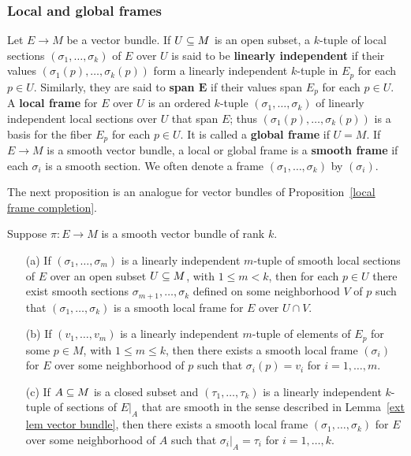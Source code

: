 \subsubsection{Local and global frames}
Let $E\to M$ be a vector bundle. If $U\subseteq M$ is an open subset, a $k$-tuple of local sections $(\sigma_1,\dots,\sigma_k)$ of $E$ over $U$ is said to be \textbf{linearly independent} if their values $(\sigma_1(p),\dots,\sigma_k(p))$ form a linearly independent $k$-tuple in $E_p$ for each $p\in U$. Similarly, they are said to \textbf{span $\bm{E}$} if their values span $E_p$ for each $p\in U$. A \textbf{local frame} for $E$ over $U$ is an ordered $k$-tuple $(\sigma_1,\dots,\sigma_k)$ of linearly independent local sections over $U$ that span $E$; thus $(\sigma_1(p),\dots,\sigma_k(p))$ is a basis for the fiber $E_p$ for each $p\in U$. It is called a \textbf{global frame} if $U=M$. If $E\to M$ is a smooth vector bundle, a local or global frame is a \textbf{smooth frame} if each $\sigma_i$ is a smooth section. We often denote a frame $(\sigma_1,\dots,\sigma_k)$ by $(\sigma_i)$.\par
The next proposition is an analogue for vector bundles of Proposition~\ref{local frame completion}.
\begin{proposition}\label{vector bundle local frame completion}
Suppose $\pi:E\to M$ is a smooth vector bundle of rank $k$.
\begin{itemize}
\item[(a)] If $(\sigma_1,\dots,\sigma_m)$ is a linearly independent $m$-tuple of smooth local sections of $E$ over an open subset $U\subseteq M$, with $1\leq m<k$, then for each $p\in U$ there exist smooth sections $\sigma_{m+1},\dots,\sigma_k$ defined on some neighborhood $V$ of $p$ such that $(\sigma_1,\dots,\sigma_k)$ is a smooth local frame for $E$ over $U\cap V$.
\item[(b)] If $(v_1,\dots,v_m)$ is a linearly independent $m$-tuple of elements of $E_p$ for some $p\in M$, with $1\leq m\leq k$, then there exists a smooth local frame $(\sigma_i)$ for $E$ over some neighborhood of $p$ such that $\sigma_i(p)=v_i$ for $i=1,\dots,m$.
\item[(c)] If $A\subseteq M$ is a closed subset and $(\tau_1,\dots,\tau_k)$ is a linearly independent $k$-tuple of sections of $E|_A$ that are smooth in the sense described in Lemma~\ref{ext lem vector bundle}, then there exists a smooth local frame $(\sigma_1,\dots,\sigma_k)$ for $E$ over some neighborhood of $A$ such that $\sigma_i|_A=\tau_i$ for $i=1,\dots,k$.
\end{itemize}
\end{proposition}

